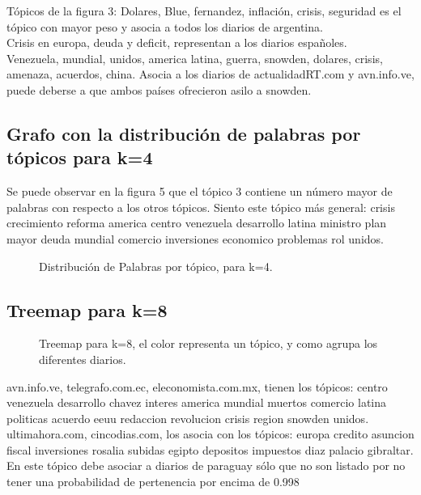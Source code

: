 \documentclass[8.5pt,twoside,twocolumn]{article}
\begin{document}
T\'opicos de la figura 3:
Dolares, Blue, fernandez, inflaci\'on, crisis, seguridad es el t\'opico con mayor peso y asocia a todos los diarios de argentina.
\\
Crisis en europa, deuda y deficit, representan a los diarios espa\~noles. 
\\
Venezuela, mundial, unidos, america latina, guerra, snowden, dolares, crisis, amenaza, acuerdos, china. Asocia a los diarios de actualidadRT.com
y avn.info.ve, puede deberse a que ambos pa\'ises ofrecieron asilo a snowden.

\subsection{ Grafo con la distribuci\'on de palabras por t\'opicos para k=4  }

Se puede observar en la figura 5 que el t\'opico 3 contiene un n\'umero mayor de palabras con respecto a los otros t\'opicos.
Siento este t\'opico m\'as general: crisis crecimiento reforma america centro venezuela desarrollo latina 
ministro plan mayor deuda mundial comercio inversiones economico problemas rol unidos.

\begin{figure}[h]
  \centering
  \caption{Distribuci\'on de Palabras por t\'opico, para k=4.}  
  \label{fgr:perplexity}
\end{figure}

\subsection{ Treemap para k=8  }

\begin{figure}[h]
  \centering
  \caption{Treemap para k=8, el color representa un t\'opico, y como agrupa los diferentes diarios.}  
  \label{fgr:treemap}
\end{figure}

 avn.info.ve, telegrafo.com.ec, eleconomista.com.mx, tienen los t\'opicos: centro venezuela
 desarrollo chavez interes america mundial muertos comercio latina
 politicas acuerdo eeuu redaccion revolucion crisis region snowden unidos. 	
\\

 ultimahora.com, cincodias.com, los asocia con los t\'opicos: europa credito asuncion
 fiscal inversiones rosalia subidas egipto depositos impuestos diaz palacio gibraltar. 
En este t\'opico debe asociar a diarios de paraguay s\'olo que no son listado por no 
tener una probabilidad de pertenencia por encima de 0.998
\\
 
\end{document}
